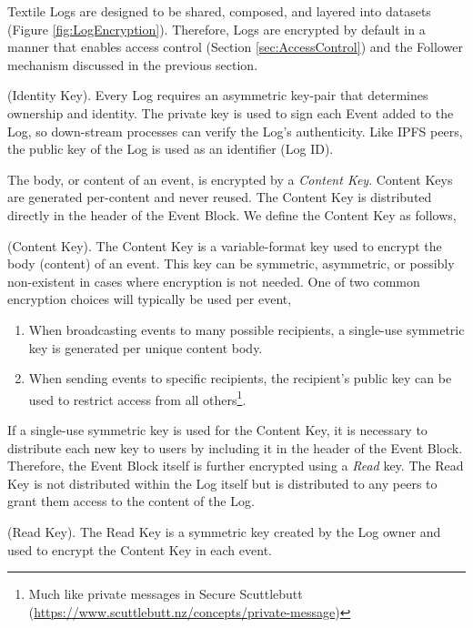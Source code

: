 \documentclass{textile}
\begin{document}
Textile Logs are designed to be shared, composed, and layered into datasets (Figure \ref{fig:LogEncryption}). Therefore, Logs are encrypted by default in a manner that enables access control (Section  \ref{sec:AccessControl}) and the Follower mechanism discussed in the previous section.

\begin{definition}
(Identity Key). Every Log requires an asymmetric key-pair that determines ownership and identity. The private key is used to sign each Event added to the Log, so down-stream processes can verify the Log's authenticity. Like IPFS peers, the public key of the Log is used as an identifier (Log ID).
\end{definition}

The body, or content of an event, is encrypted by a \emph{Content Key}. Content Keys are generated per-content and never reused. The Content Key is distributed directly in the header of the Event Block. We define the Content Key as follows,

\begin{definition}
(Content Key). The Content Key is a variable-format key used to encrypt the body (content) of an event. This key can be symmetric, asymmetric, or possibly non-existent in cases where encryption is not needed. One of two common encryption choices will typically be used per event, 
\begin{enumerate}
\item When broadcasting events to many possible recipients, a single-use symmetric key is generated per unique content body.
\item When sending events to specific recipients, the recipient's public key can be used to restrict access from all others\footnote{Much like private messages in Secure Scuttlebutt (\url{https://www.scuttlebutt.nz/concepts/private-message})}.
\end{enumerate}
\end{definition}

If a single-use symmetric key is used for the Content Key, it is necessary to distribute each new key to users by including it in the header of the Event Block. Therefore, the Event Block itself is further encrypted using a \emph{Read} key. The Read Key is not distributed within the Log itself but is distributed to any peers to grant them access to the content of the Log. 

\begin{definition}
 (Read Key). The Read Key is a symmetric key created by the Log owner and used to encrypt the Content Key in each event.
\end{definition}
\end{document}
